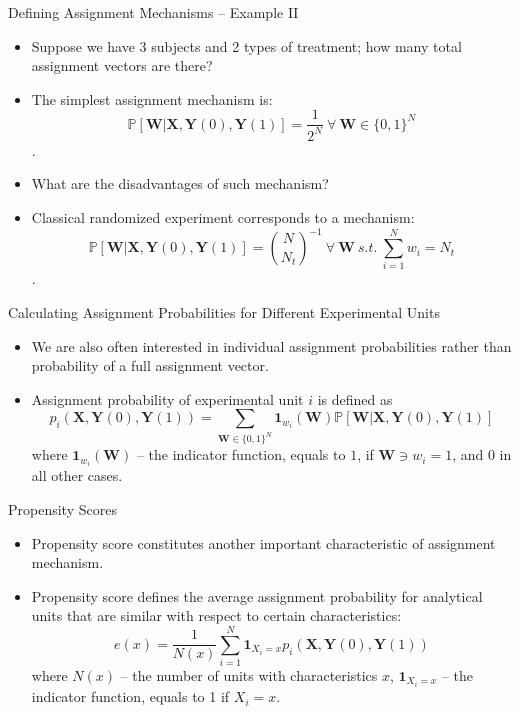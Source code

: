 \documentclass{beamer}
\begin{document}
\begin{frame}{Defining Assignment Mechanisms -- Example II}
\begin{itemize}
\item Suppose we have 3 subjects and 2 types of treatment; how many total assignment vectors are there? 
\item The simplest assignment mechanism is: $$\mathbb{P}[\mathbf{W}|\mathbf{X},\mathbf{Y}(0), \mathbf{Y}(1)] = \frac{1}{2^N} \ \forall \ \mathbf{W} \in \{0,1\}^N$$.
\item What are the disadvantages of such mechanism? 
\item Classical randomized experiment corresponds to a mechanism: $$\mathbb{P}[\mathbf{W}|\mathbf{X},\mathbf{Y}(0), \mathbf{Y}(1)] = {N \choose N_t}^{-1} \ \forall \ \mathbf{W} \ s.t. \ \sum_{i=1}^N w_i = N_t$$.
\end{itemize}
\end{frame}
\begin{frame}{Calculating Assignment Probabilities for Different Experimental Units}
\begin{itemize}	
\setlength\itemsep{1em}
\item We are also often interested in individual assignment probabilities rather than probability of a full assignment vector. 
\item Assignment probability of experimental unit $i$ is defined as $$p_i(\mathbf{X}, \mathbf{Y}(0), \mathbf{Y}(1)) = \sum_{\mathbf{W} \in \{0,1\}^N}\mathbf{1}_{w_i}(\mathbf{W})\mathbb{P}[\mathbf{W}|\mathbf{X},\mathbf{Y}(0), \mathbf{Y}(1)]$$
where $\mathbf{1}_{w_i}(\mathbf{W})$ -- the indicator function, equals to $1$, if $\mathbf{W} \ni w_i = 1$, and 0 in all other cases. 
\end{itemize}
\end{frame}
\begin{frame}{Propensity Scores}
\begin{itemize}	
\setlength\itemsep{1em}
\item Propensity score constitutes another important characteristic of assignment mechanism. 
\item Propensity score defines the average assignment probability for analytical units that are similar with respect to certain characteristics: $$e(x) = \frac{1}{N(x)}\sum_{i=1}^N\mathbf{1}_{X_i = x}p_i(\mathbf{X}, \mathbf{Y}(0), \mathbf{Y}(1))$$
where $N(x)$ -- the number of units with characteristics $x$, $\mathbf{1}_{X_i = x}$ -- the indicator function, equals to 1 if $X_i = x$. 
\end{itemize}
\end{frame}
\end{document}
